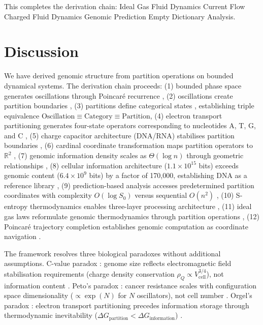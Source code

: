 \documentclass[11pt,a4paper]{article}
\theoremstyle{remark}
\begin{document}
This completes the derivation chain: Ideal Gas \to Fluid Dynamics \to Current Flow \to Charged Fluid Dynamics \to Genomic Prediction \to Empty Dictionary Analysis.


\section{Discussion}

We have derived genomic structure from partition operations on bounded dynamical systems. The derivation chain proceeds: (1) bounded phase space generates oscillations through Poincaré recurrence \citep{poincare1890probleme, birkhoff1931proof}, (2) oscillations create partition boundaries \citep{arnold1978mathematical}, (3) partitions define categorical states \citep{kolmogorov1957theory}, establishing triple equivalence $\text{Oscillation} \equiv \text{Category} \equiv \text{Partition}$, (4) electron transport partitioning generates four-state operators corresponding to nucleotides A, T, G, and C \citep{mitchell1961coupling, nicholls2013bioenergetics}, (5) charge capacitor architecture (DNA/RNA) stabilises partition boundaries \citep{watson1953molecular, bloomfield1997dna}, (6) cardinal coordinate transformation maps partition operators to $\mathbb{R}^2$ \citep{nandy2006graphical, yau2003dna}, (7) genomic information density scales as $\Theta(\log n)$ through geometric relationships \citep{shannon1948mathematical, schneider1986information}, (8) cellular information architecture ($1.1 \times 10^{15}$ bits) exceeds genomic content ($6.4 \times 10^9$ bits) by a factor of 170,000, establishing DNA as a reference library \citep{elowitz2002stochastic, larsson2019genomic}, (9) prediction-based analysis accesses predetermined partition coordinates with complexity $O(\log S_0)$ versus sequential $O(n^2)$ \citep{altschul1990basic, landauer1961irreversibility}, (10) S-entropy thermodynamics enables three-layer processing architecture \citep{callen1985thermodynamics, jarzynski1997nonequilibrium}, (11) ideal gas laws reformulate genomic thermodynamics through partition operations \citep{reif1965fundamentals}, (12) Poincaré trajectory completion establishes genomic computation as coordinate navigation \citep{poincare1890probleme}.

The framework resolves three biological paradoxes without additional assumptions. C-value paradox \citep{gregory2001coincidence, gregory2005genome}: genome size reflects electromagnetic field stabilisation requirements (charge density conservation $\rho_Q \propto V_{\text{cell}}^{3/4}$), not information content \citep{Sachikonye2025_CValue}. Peto's paradox \citep{peto1977naturally, caulin2015petos}: cancer resistance scales with configuration space dimensionality ($\propto \exp(N)$ for $N$ oscillators), not cell number \citep{Sachikonye2025_Peto}. Orgel's paradox \citep{orgel1968evolution, orgel2004prebiotic}: electron transport partitioning precedes information storage through thermodynamic inevitability ($\Delta G_{\text{partition}} < \Delta G_{\text{information}}$) \citep{russell2007alkaline, Sachikonye2025_Origins}.
\end{document}
